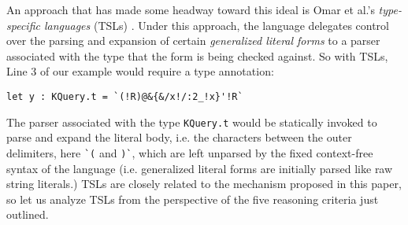 \documentclass[acmsmall,review,anonymous]{acmart}\settopmatter{printfolios=true,printccs=false,printacmref=false}
\newcommand{\li}[1]{\lstinline[basicstyle=\ttfamily\fontsize{9pt}{1em}\selectfont]{#1}}
\begin{document}
An approach that has made some headway toward this ideal is Omar et al.'s \emph{type-specific languages} (TSLs) \cite{TSLs}. Under this approach, the language delegates control over the parsing and expansion of certain \emph{generalized literal forms} to a parser associated with the type that the form is being checked against. So with TSLs, Line 3 of our example would require a type annotation:
\begin{lstlisting}[numbers=none,basicstyle=\ttfamily\fontsize{9pt}{1em}\selectfont]
  let y : KQuery.t = `(!R)@&{&/x!/:2_!x}'!R`
\end{lstlisting}
The parser associated with the type \li{KQuery.t} would be statically invoked to parse and expand the literal body, i.e. the characters between the outer delimiters, here \li{`(} and \li{)`}, which are left unparsed by the fixed context-free syntax of the language (i.e. generalized literal forms are initially parsed like raw string literals.) TSLs are closely related to the mechanism proposed in this paper, so let us analyze TSLs from the perspective of the five reasoning criteria just outlined.
\end{document}
